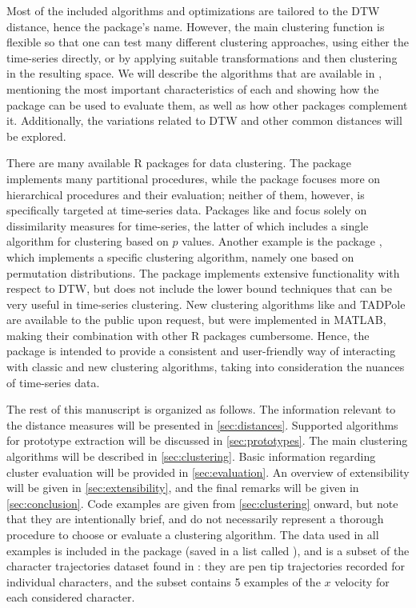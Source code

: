 Most of the included algorithms and optimizations are tailored to the DTW distance, hence the package's name.
However, the main clustering function is flexible so that one can test many different clustering approaches,
using either the time-series directly,
or by applying suitable transformations and then clustering in the resulting space.
We will describe the algorithms that are available in \dtwclust{},
mentioning the most important characteristics of each and showing how the package can be used to evaluate them,
as well as how other packages complement it.
Additionally, the variations related to DTW and other common distances will be explored.

There are many available R packages for data clustering.
The  package \citep{leisch2006} implements many partitional procedures,
while the  package \citep{cluster} focuses more on hierarchical procedures and their evaluation;
neither of them, however, is specifically targeted at time-series data.
Packages like  \citep{tsdist} and  \citep{montero2014} focus solely on dissimilarity measures for time-series,
the latter of which includes a single algorithm for clustering based on $p$ values.
Another example is the  package \citep{brandmaier2015},
which implements a specific clustering algorithm,
namely one based on permutation distributions.
The  package \citep{giorgino2009} implements extensive functionality with respect to DTW,
but does not include the lower bound techniques that can be very useful in time-series clustering.
New clustering algorithms like \kshape{} \citep{paparrizos2015} and TADPole \citep{begum2015} are available to the public upon request,
but were implemented in MATLAB, 
making their combination with other R packages cumbersome.
Hence, the \dtwclust{} package is intended to provide a consistent and user-friendly way of interacting with classic and new clustering algorithms,
taking into consideration the nuances of time-series data.

The rest of this manuscript is organized as follows.
The information relevant to the distance measures will be presented in \cref{sec:distances}.
Supported algorithms for prototype extraction will be discussed in \cref{sec:prototypes}.
The main clustering algorithms will be described in \cref{sec:clustering}.
Basic information regarding cluster evaluation will be provided in \cref{sec:evaluation}.
An overview of extensibility will be given in \cref{sec:extensibility},
and the final remarks will be given in \cref{sec:conclusion}.
Code examples are given from \cref{sec:clustering} onward,
but note that they are intentionally brief,
and do not necessarily represent a thorough procedure to choose or evaluate a clustering algorithm.
The data used in all examples is included in the package (saved in a list called ),
and is a subset of the character trajectories dataset found in \citet{lichman2013}:
they are pen tip trajectories recorded for individual characters,
and the subset contains 5 examples of the $x$ velocity for each considered character.


